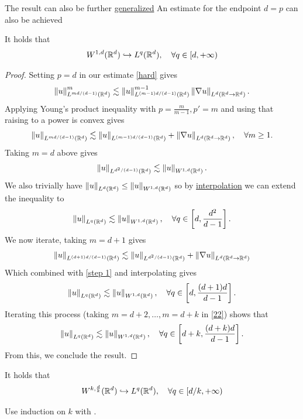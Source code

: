 \documentclass[
    a4paper,
    DIV=14,
    abstract=true,
    numbers=noenddot
]{scrartcl}
\begin{document}
The result can also be further \href{https://en.wikipedia.org/wiki/Gagliardo%E2%80%93Nirenberg_interpolation_inequality}{generalized}
An estimate for the endpoint $d=p$ can also be achieved
\begin{theorem}\label{estt2}
	It holds that
	\begin{align*}
		W^{1,d}(\mathbb{R}^d) \hookrightarrow L^q(\mathbb{R}^d) , \quad\forall  q \in [d,+\infty)
	\end{align*}
\end{theorem}
\begin{proof}
	Setting $p=d$ in our estimate  \eqref{hard} gives
	\begin{align*}
		\left\lVert u \right\rVert_{L^{ m d/(d-1)}(\mathbb{R}^d)}^{m}\lesssim  \left\lVert u \right\rVert_{L^{(m-1)d /(d-1)}(\mathbb{R}^d)}^{m-1}\left\lVert \nabla u \right\rVert_{L^{d}(\mathbb{R}^d \to  \mathbb{R}^d)} .
	\end{align*}
	Applying Young's product inequality with $p = \frac{m}{m-1}, p'= m$ and using that raising to a power is convex gives
	\begin{align}\label{22}
		\left\lVert u \right\rVert_{L^{ m d/(d-1)}(\mathbb{R}^d)}\lesssim \left\lVert u \right\rVert_{L^{(m-1)d/(d-1)}(\mathbb{R}^d)}+\left\lVert \nabla u \right\rVert_{L^{d}(\mathbb{R}^d \to  \mathbb{R}^d)} , \quad\forall  m \geq 1.
	\end{align}
	Taking $m=d$ above gives
	\begin{align*}
		\left\lVert u \right\rVert_{L^{d^2 /(d-1)}(\mathbb{R}^d)} \lesssim  \left\lVert u \right\rVert_{W^{1,d}(\mathbb{R}^d)}.
	\end{align*}
	We also trivially have $\left\lVert u \right\rVert_{L^d(\mathbb{R}^d)} \leq\left\lVert u \right\rVert_{W^{1,d}(\mathbb{R}^d)} $ so by \href{https://en.wikipedia.org/wiki/Riesz%E2%80%93Thorin_theorem#:~:text=%5Bedit%5D-,First,-we%20need%20the}{interpolation} we can extend the inequality to
	\begin{align}\label{step 1}
		\left\lVert u \right\rVert_{L^{q}(\mathbb{R}^d)} \lesssim  \left\lVert u \right\rVert_{W^{1,d}(\mathbb{R}^d)} , \quad\forall q \in \left[d,\frac{d^2}{d-1}\right].
	\end{align}
	We now iterate, taking $m=d+1$ gives
	\begin{align*}
		\left\lVert u \right\rVert_{L^{ (d+1)d/(d-1)}(\mathbb{R}^d)}\lesssim \left\lVert u \right\rVert_{L^{d^2/(d-1)}(\mathbb{R}^d)}+\left\lVert \nabla u \right\rVert_{L^{d}(\mathbb{R}^d \to  \mathbb{R}^d)}             \end{align*}
	Which combined with \eqref{step 1} and interpolating gives
	\begin{align*}
		\left\lVert u \right\rVert_{L^{q}(\mathbb{R}^d)} \lesssim  \left\lVert u \right\rVert_{W^{1,d}(\mathbb{R}^d)} , \quad\forall q \in \left[d,\frac{(d+1)d}{d-1}\right].
	\end{align*}
	Iterating this process (taking $m=d+2,\ldots, m=d+k$ in \eqref{22}) shows that    \begin{align*}
		\left\lVert u \right\rVert_{L^{q}(\mathbb{R}^d)} \lesssim  \left\lVert u \right\rVert_{W^{1,d}(\mathbb{R}^d)} , \quad\forall q \in \left[d+k,\frac{(d+k)d}{d-1}\right].
	\end{align*}
	From this, we conclude the result.     \end{proof}
\begin{exercise}\label{est22}
	It holds that
	\begin{align*}
		W^{k,\frac{d}{k}}(\mathbb{R}^d) \hookrightarrow L^q(\mathbb{R}^d) , \quad\forall  q \in [d /k,+\infty)
	\end{align*}
\end{exercise}
\begin{hint}
	Use induction on $k$  with .
\end{hint}
\end{document}

